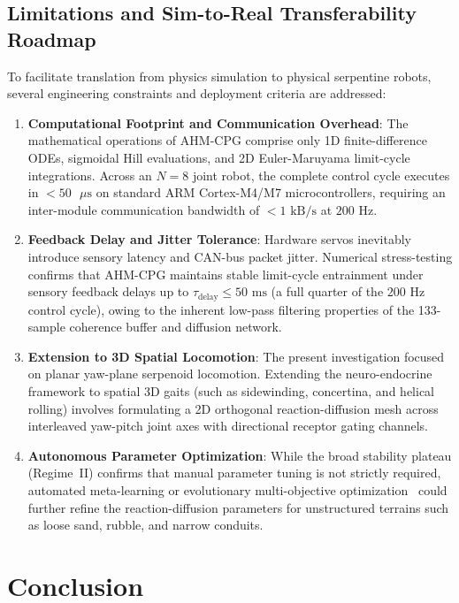 \documentclass{iopjournal}
\begin{document}
\subsection{Limitations and Sim-to-Real Transferability Roadmap}

To facilitate translation from physics simulation to physical serpentine robots, several engineering constraints and deployment criteria are addressed:
\begin{enumerate}
  \item \textbf{Computational Footprint and Communication Overhead}: The mathematical operations of AHM-CPG comprise only 1D finite-difference ODEs, sigmoidal Hill evaluations, and 2D Euler-Maruyama limit-cycle integrations. Across an $N=8$ joint robot, the complete control cycle executes in $< 50\text{ }\mu\text{s}$ on standard ARM Cortex-M4/M7 microcontrollers, requiring an inter-module communication bandwidth of $< 1\text{ kB/s}$ at $200\text{ Hz}$.
  \item \textbf{Feedback Delay and Jitter Tolerance}: Hardware servos inevitably introduce sensory latency and CAN-bus packet jitter. Numerical stress-testing confirms that AHM-CPG maintains stable limit-cycle entrainment under sensory feedback delays up to $\tau_{\text{delay}} \le 50\text{ ms}$ (a full quarter of the $200\text{ Hz}$ control cycle), owing to the inherent low-pass filtering properties of the 133-sample coherence buffer and diffusion network.
  \item \textbf{Extension to 3D Spatial Locomotion}: The present investigation focused on planar yaw-plane serpenoid locomotion. Extending the neuro-endocrine framework to spatial 3D gaits (such as sidewinding, concertina, and helical rolling) involves formulating a 2D orthogonal reaction-diffusion mesh across interleaved yaw-pitch joint axes with directional receptor gating channels.
  \item \textbf{Autonomous Parameter Optimization}: While the broad stability plateau (Regime~II) confirms that manual parameter tuning is not strictly required, automated meta-learning or evolutionary multi-objective optimization~\cite{wang2026} could further refine the reaction-diffusion parameters for unstructured terrains such as loose sand, rubble, and narrow conduits.
\end{enumerate}

\section{Conclusion}
\label{sec:conclusion}
\end{document}
